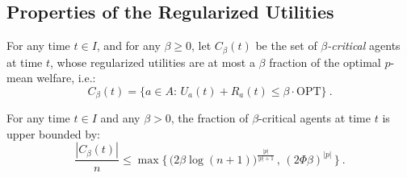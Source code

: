 \documentclass[11pt,letterpaper]{article}
\newcommand{\OPT}{\mathrm{OPT}}
\newcommand{\utility}{U}
\newcommand{\regularizer}{R}
\begin{document}
\subsection{Properties of the Regularized Utilities}







\begin{definition}
\label{def:critical}
	For any time $t \in I$, and for any $\beta  \geq 0$, let $C_\beta(t)$ be the set of \emph{$\beta$-critical} agents at time $t$, whose regularized utilities are at most a $\beta$ fraction of the optimal $p$-mean welfare, i.e.:
	\[
		C_{\beta}(t) = \Big\{a\in A:\,\utility_a(t)+\regularizer_a(t) \leq \beta \cdot \OPT \Big\}
		~.
	\]
\end{definition}

\begin{lemma}
	\label{lem:critical-agent-number}
	For any time $t\in I$ and any $\beta > 0$, the fraction of $\beta$-critical agents at time $t$ is upper bounded by:
	\[
		\frac{|C_\beta(t)|}{n} \le \max \Big\{ \, \big(2 \beta \log(n+1) \big)^{\frac{|p|}{|p|+1}} \,,\, (2\Phi\beta)^{|p|} \,\Big\}
		~.
	\]
\end{lemma}
\end{document}
